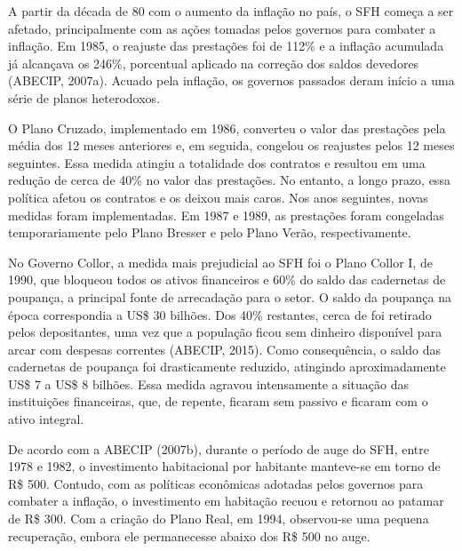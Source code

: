 \documentclass[
  12pt,
  a4paper,
]{scrreprt}
\begin{document}
\vspace{12pt}

A partir da década de 80 com o aumento da inflação no país, o SFH começa
a ser afetado, principalmente com as ações tomadas pelos governos para
combater a inflação. Em 1985, o reajuste das prestações foi de 112\% e a
inflação acumulada já alcançava os 246\%, porcentual aplicado na
correção dos saldos devedores (ABECIP, 2007a). Acuado pela inflação, os
governos passados deram início a uma série de planos heterodoxos.

\vspace{12pt}

O Plano Cruzado, implementado em 1986, converteu o valor das prestações
pela média dos 12 meses anteriores e, em seguida, congelou os reajustes
pelos 12 meses seguintes. Essa medida atingiu a totalidade dos contratos
e resultou em uma redução de cerca de 40\% no valor das prestações. No
entanto, a longo prazo, essa política afetou os contratos e os deixou
mais caros. Nos anos seguintes, novas medidas foram implementadas. Em
1987 e 1989, as prestações foram congeladas temporariamente pelo Plano
Bresser e pelo Plano Verão, respectivamente.

\vspace{12pt}

No Governo Collor, a medida mais prejudicial ao SFH foi o Plano Collor
I, de 1990, que bloqueou todos os ativos financeiros e 60\% do saldo das
cadernetas de poupança, a principal fonte de arrecadação para o setor. O
saldo da poupança na época correspondia a US\$ 30 bilhões. Dos 40\%
restantes, cerca de foi retirado pelos depositantes, uma vez que a
população ficou sem dinheiro disponível para arcar com despesas
correntes (ABECIP, 2015). Como consequência, o saldo das cadernetas de
poupança foi drasticamente reduzido, atingindo aproximadamente US\$ 7 a
US\$ 8 bilhões. Essa medida agravou intensamente a situação das
instituições financeiras, que, de repente, ficaram sem passivo e ficaram
com o ativo integral.

\vspace{12pt}

De acordo com a ABECIP (2007b), durante o período de auge do SFH, entre
1978 e 1982, o investimento habitacional por habitante manteve-se em
torno de R\$ 500. Contudo, com as políticas econômicas adotadas pelos
governos para combater a inflação, o investimento em habitação recuou e
retornou ao patamar de R\$ 300. Com a criação do Plano Real, em 1994,
observou-se uma pequena recuperação, embora ele permanecesse abaixo dos
R\$ 500 no auge.
\end{document}
